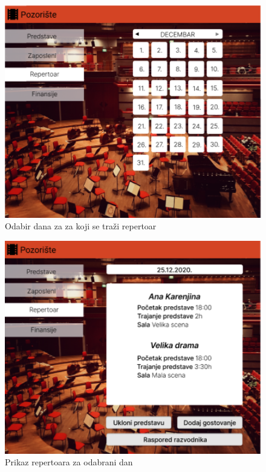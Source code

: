\documentclass[a4paper]{article}
\begin{document}
\begin{figure}[H]
  \begin{center}
    \includegraphics[width=130mm]{../images/ui_repertoar1.png}
  \end{center}
  \caption{Odabir dana za za koji se traži repertoar}
  \label{repertoar}
\end{figure}

\begin{figure}[H]
  \begin{center}
    \includegraphics[width=130mm]{../images/ui_repertoar2.png}
  \end{center}
  \caption{Prikaz repertoara za odabrani dan}
  \label{prikaz_repertoara}
\end{figure}
\end{document}
